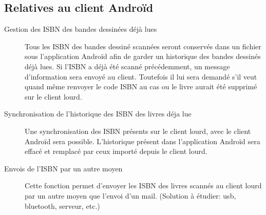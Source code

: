 \subsection{Relatives au client Androïd}
\begin{description}

\item[Gestion des ISBN des bandes dessinées déjà lues]
	Tous les ISBN des bandes dessiné scannées seront conservés dans un fichier sous l'application Androïd afin de garder un historique des bandes dessinés déjà lues.
	Si l'ISBN a déjà été scanné précédemment, un message d'information sera envoyé au client. 
	Toutefois il lui sera demandé s'il veut quand même renvoyer le code ISBN au cas ou le livre aurait été supprimé sur le client lourd. 

\item[Synchronisation de l'historique des ISBN des livres déja lue]
	Une synchronisation des ISBN présents sur le client lourd, avec le client Androïd sera possible. 
	L'historique présent dans l'application Androïd sera effacé et remplacé par ceux importé depuis le client lourd.

\item[Envois de l'ISBN par un autre moyen]
	Cette fonction permet d'envoyer les ISBN des livres scannés au client lourd par un autre moyen que l'envoi d'un mail. 
	(Solution à étudier: usb, bluetooth, serveur, etc.)

\end{description}

